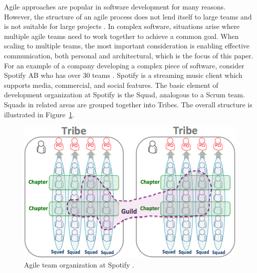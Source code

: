 
Agile approaches are popular in software development for many reasons.
However, the structure of an agile process does not lend itself to large teams and is not suitable for large projects \cite{Rubin12}.
In complex software, situations arise where multiple agile teams need to work together to achieve a common goal.
When scaling to multiple teams, the most important consideration is enabling effective communication, both personal and architectural, which is the focus of this paper.
%
For an example of a company developing a complex piece of software, consider Spotify AB who has over 30 teams \cite{kniberg12}.
Spotify is a streaming music client which supports media, commercial, and social features.
The basic element of development organization at Spotify is the Squad, analogous to a Scrum team.
Squads in related areas are grouped together into Tribes. 
The overall structure is illustrated in Figure~\ref{fig:spotify_structure}.
\begin{figure}[h]
  \includegraphics[width=\linewidth]{images/kniberg12_structure.png}
  \caption{Agile team organization at Spotify \cite{kniberg12}.}
  \label{fig:spotify_structure}
\end{figure}


